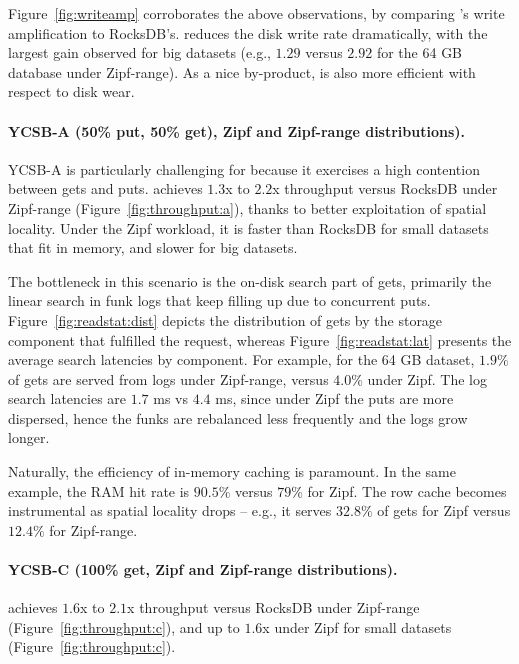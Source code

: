 Figure~\ref{fig:writeamp} corroborates the above observations, by comparing 
\sys's write amplification to RocksDB's. \sys\/ reduces the disk write rate dramatically, 
with the largest gain observed for big datasets (e.g., $1.29$ versus $2.92$ for the 64 GB 
database under Zipf-range). As a nice by-product, \sys\/ is also more 
efficient with respect to disk wear.  

\paragraph{YCSB-A (50\% put, 50\% get), Zipf and Zipf-range distributions).}
YCSB-A  is particularly challenging for \sys\/ because it exercises a high contention between gets and puts. 
\sys\/ achieves $1.3$x to $2.2$x throughput versus RocksDB under Zipf-range (Figure~\ref{fig:throughput:a}), 
thanks to better exploitation of spatial locality. Under the Zipf workload, it is faster than RocksDB for small
datasets that fit in memory, and slower for big datasets.  

The bottleneck in this scenario is the on-disk search part of gets, primarily the linear search in funk logs 
that keep filling up due to concurrent puts. Figure~\ref{fig:readstat:dist} depicts the distribution of gets 
by the storage component that fulfilled the request, whereas Figure~\ref{fig:readstat:lat} presents the 
average search latencies by component. For example, for the 64 GB dataset, $1.9\%$ of gets are served 
from logs under Zipf-range, versus $4.0\%$ under Zipf. The log search latencies are 
$1.7$ ms vs $4.4$ ms, since under Zipf the puts are more dispersed, hence the funks are rebalanced 
less frequently and the logs grow longer. 


Naturally, the efficiency of in-memory caching is paramount. In the same example, the RAM hit rate is 
$90.5\%$ versus $79\%$ for Zipf. The row cache becomes instrumental as spatial locality drops --
e.g., it serves $32.8\%$ of gets for Zipf versus $12.4\%$ for Zipf-range. 

\paragraph{YCSB-C (100\% get, Zipf and Zipf-range distributions).}  
\sys\/ achieves $1.6$x to $2.1$x throughput versus RocksDB under Zipf-range (Figure~\ref{fig:throughput:c}),
and up to $1.6$x under Zipf for small datasets (Figure~\ref{fig:throughput:c}).   


